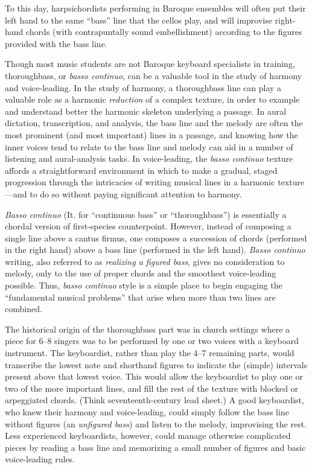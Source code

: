 \documentclass{book}
\begin{document}
To this day, harpsichordists performing in Baroque ensembles will often put
their left hand to the same ``bass'' line that the cellos play, and will
improvise right-hand chords (with contrapuntally sound embellishment)
according to the figures provided with the bass line.

Though most music students are not Baroque keyboard specialists in training,
thoroughbass, or \emph{basso continuo}, can be a valuable tool in the study of
harmony and voice-leading. In the study of harmony, a thoroughbass line can
play a valuable role as a harmonic \emph{reduction} of a complex texture, in
order to example and understand better the harmonic skeleton underlying a
passage. In aural dictation, transcription, and analysis, the bass line and
the melody are often the most prominent (and most important) lines in a
passage, and knowing how the inner voices tend to relate to the bass line and
melody can aid in a number of listening and aural-analysis tasks. In
voice-leading, the \emph{basso continuo} texture affords a straightforward
environment in which to make a gradual, staged progression through the
intricacies of writing musical lines in a harmonic texture---and to do so
without paying significant attention to harmony.

\emph{Basso continuo} (It. for ``continuous bass'' or ``thoroughbass'') is
essentially a chordal version of first-species counterpoint. However, instead
of composing a single line above a cantus firmus, one composes a succession of
chords (performed in the right hand) above a bass line (performed in the left
hand). \emph{Basso continuo} writing, also referred to as \emph{realizing a
figured bass}, gives no consideration to melody, only to the use of proper
chords and the smoothest voice-leading possible. Thus, \emph{basso continuo}
style is a simple place to begin engaging the ``fundamental musical problems''
that arise when more than two lines are combined.

The historical origin of the thoroughbass part was in church settings where a
piece for 6--8 singers was to be performed by one or two voices with a
keyboard instrument. The keyboardist, rather than play the 4--7 remaining
parts, would transcribe the lowest note and shorthand figures to indicate the
(simple) intervals present above that lowest voice. This would allow the
keyboardist to play one or two of the more important lines, and fill the rest
of the texture with blocked or arpeggiated chords. (Think seventeenth-century
lead sheet.) A good keyboardist, who knew their harmony and voice-leading,
could simply follow the bass line without figures (an \emph{unfigured bass})
and listen to the melody, improvising the rest. Less experienced keyboardists,
however, could manage otherwise complicated pieces by reading a bass line and
memorizing a small number of figures and basic voice-leading rules.
\end{document}
